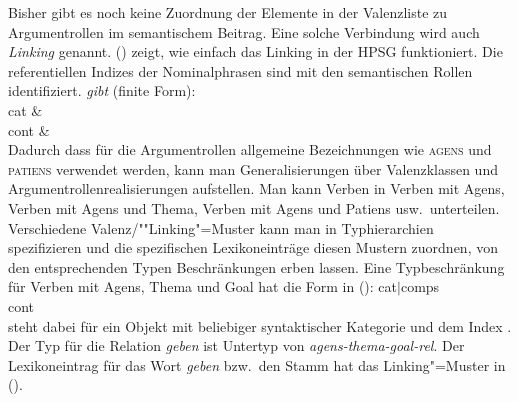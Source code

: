 Bisher gibt es noch keine Zuordnung der Elemente in der Valenzliste zu
Argumentrollen im semantischem Beitrag.
Eine solche Verbindung wird auch \emph{Linking} genannt.
() zeigt, wie einfach das Linking in der HPSG funktioniert.
Die referentiellen Indizes der Nominalphrasen sind mit den semantischen Rollen identifiziert.
\ea
\label{le-geben}
\textit{gibt\/} (finite Form):\\
\ms
{ cat &  \\
  cont &   \\
}
\z
Dadurch dass für die Argumentrollen allgemeine Bezeichnungen wie \textsc{agens} und \textsc{patiens}
verwendet werden, kann man Generalisierungen über Valenzklassen und
Argumentrollenrealisierungen aufstellen. Man kann \zb Verben in Verben mit Agens, Verben mit Agens
und Thema, Verben mit Agens und Patiens usw.\ unterteilen. Verschiedene Valenz/""Linking"=Muster kann man
in Typhierarchien spezifizieren und die spezifischen Lexikoneinträge diesen Mustern zuordnen,
\dash von den entsprechenden Typen Beschränkungen erben lassen. Eine Typbeschränkung für
Verben mit Agens, Thema und Goal hat die Form in ():
\ea
\onems
{ cat$|$comps  \\[1mm]
  cont   \\
}
\z
[] steht dabei für ein Objekt mit beliebiger syntaktischer Kategorie und dem Index
. 
Der Typ für die Relation \textit{geben\/} ist Untertyp von \textit{agens-thema-goal-rel\/}.
Der Lexikoneintrag für das Wort \emph{geben} bzw.\ den Stamm  hat das Linking"=Muster in ().

